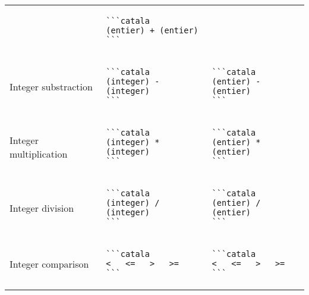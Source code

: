 \documentclass[a3paper,landscape]{article}
\begin{document}
\begin{multicols*}{2}
\begin{center}
\begin{tabular}{p{}p{}p{}}
&
\vspace*{-1.75em}
\begin{verbatim}
```catala
(entier) + (entier)
```
\end{verbatim}
\vspace*{-1.75em}
\\
Integer substraction&
\vspace*{-1.75em}
\begin{verbatim}
```catala
(integer) - (integer)
```
\end{verbatim}
\vspace*{-1.75em}
&
\vspace*{-1.75em}
\begin{verbatim}
```catala
(entier) - (entier)
```
\end{verbatim}
\vspace*{-1.75em}
\\
Integer multiplication&
\vspace*{-1.75em}
\begin{verbatim}
```catala
(integer) * (integer)
```
\end{verbatim}
\vspace*{-1.75em}
&
\vspace*{-1.75em}
\begin{verbatim}
```catala
(entier) * (entier)
```
\end{verbatim}
\vspace*{-1.75em}
\\
Integer division&
\vspace*{-1.75em}
\begin{verbatim}
```catala
(integer) / (integer)
```
\end{verbatim}
\vspace*{-1.75em}
&
\vspace*{-1.75em}
\begin{verbatim}
```catala
(entier) / (entier)
```
\end{verbatim}
\vspace*{-1.75em}
\\
Integer comparison&
\vspace*{-1.75em}
\begin{verbatim}
```catala
<   <=   >   >=
```
\end{verbatim}
\vspace*{-1.75em}
&
\vspace*{-1.75em}
\begin{verbatim}
```catala
<   <=   >   >=
```
\end{verbatim}

\end{tabular}
\end{center}
\end{multicols*}
\end{document}

